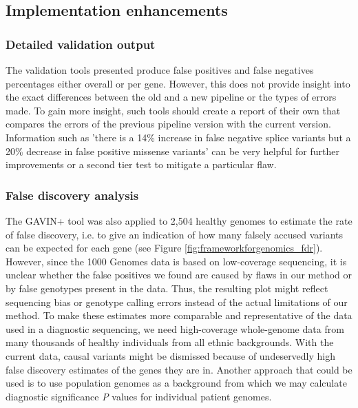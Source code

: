 \subsection{Implementation enhancements}

\subsubsection{Detailed validation output}
The validation tools presented produce false positives and false negatives percentages either overall or per gene.
However, this does not provide insight into the exact differences between the old and a new pipeline or the types of errors made.
To gain more insight, such tools should create a report of their own that compares the errors of the previous pipeline version with the current version.
Information such as 'there is a 14\% increase in false negative splice variants but a 20\% decrease in false positive missense variants' can be very helpful for further improvements or a second tier test to mitigate a particular flaw.

\subsubsection{False discovery analysis}

The GAVIN+ tool was also applied to 2,504 healthy genomes to estimate the rate of false discovery, i.e. to give an indication of how many falsely accused variants can be expected for each gene (see Figure \ref{fig:frameworkforgenomics_fdr}). 
However, since the 1000 Genomes data is based on low-coverage sequencing, it is unclear whether the false positives we found are caused by flaws in our method or by false genotypes present in the data.
Thus, the resulting plot might reflect sequencing bias or genotype calling errors instead of the actual limitations of our method.
To make these estimates more comparable and representative of the data used in a diagnostic sequencing, we need high-coverage whole-genome data from many thousands of  healthy individuals from all ethnic backgrounds.
With the current data, causal variants might be dismissed because of undeservedly high false discovery estimates of the genes they are in.
Another approach that could be used is to use population genomes as a background from which we may calculate diagnostic significance \textsl{P} values for individual patient genomes\cite{Wilfert_2016}.


